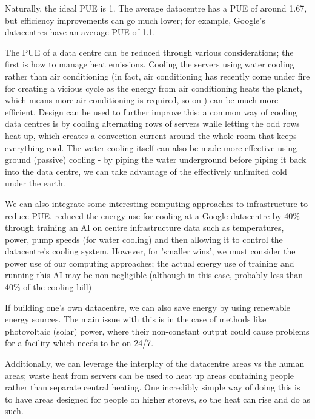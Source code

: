 \documentclass{article}
\begin{document}
Naturally, the ideal PUE is 1. The average datacentre has a PUE of around 1.67, but efficiency improvements can go much lower; for example, Google's datacentres have an average PUE of 1.1. \citep{holzle2020data}\newline

The PUE of a data centre can be reduced through various considerations; the first is how to manage heat emissions. Cooling the servers using water cooling rather than air conditioning (in fact, air conditioning has recently come under fire for creating a vicious cycle as the energy from air conditioning heats the planet, which means more air conditioning is required, so on \citep{ospina2018cooling}) can be much more efficient. Design can be used to further improve this; a common way of cooling data centres is by cooling alternating rows of servers while letting the odd rows heat up, which creates a convection current around the whole room that keeps everything cool. The water cooling itself can also be made more effective using ground (passive) cooling - by piping the water underground before piping it back into the data centre, we can take advantage of the effectively unlimited cold under the earth. \newline

We can also integrate some interesting computing approaches to infrastructure to reduce PUE. \citet{evans2016deepmind} reduced the energy use for cooling at a Google datacentre by 40\% through training an AI on centre infrastructure data such as temperatures, power, pump speeds (for water cooling) and then allowing it to control the datacentre's cooling system. However, for 'smaller wins', we must consider the power use of our computing approaches; the actual energy use of training and running this AI may be non-negligible (although in this case, probably less than 40\% of the cooling bill) \newline

If building one's own datacentre, we can also save energy by using renewable energy sources. The main issue with this is in the case of methods like photovoltaic (solar) power, where their non-constant output could cause problems for a facility which needs to be on 24/7.\newline

Additionally, we can leverage the interplay of the datacentre areas vs the human areas; waste heat from servers can be used to heat up areas containing people rather than separate central heating. One incredibly simple way of doing this is to have areas designed for people on higher storeys, so the heat can rise and do as such. \newline
\end{document}

